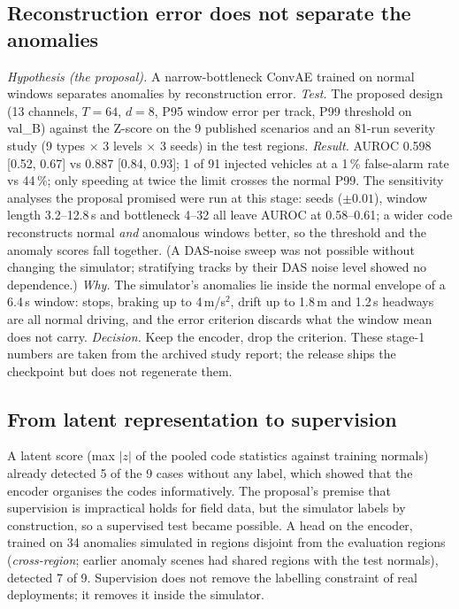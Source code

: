 \documentclass[10pt,a4paper,twocolumn]{article}
\begin{document}
\subsection{Reconstruction error does not separate the anomalies}
\emph{Hypothesis (the proposal).} A narrow-bottleneck ConvAE trained on normal windows separates anomalies by reconstruction error. \emph{Test.} The proposed design (13 channels, $T=64$, $d=8$, P95 window error per track, P99 threshold on val\_B) against the Z-score on the 9 published scenarios and an 81-run severity study (9 types $\times$ 3 levels $\times$ 3 seeds) in the test regions. \emph{Result.} AUROC 0.598 [0.52, 0.67] vs 0.887 [0.84, 0.93]; 1 of 91 injected vehicles at a 1\,\% false-alarm rate vs 44\,\%; only speeding at twice the limit crosses the normal P99. The sensitivity analyses the proposal promised were run at this stage: seeds ($\pm0.01$), window length 3.2--12.8\,s and bottleneck 4--32 all leave AUROC at 0.58--0.61; a wider code reconstructs normal \emph{and} anomalous windows better, so the threshold and the anomaly scores fall together. (A DAS-noise sweep was not possible without changing the simulator; stratifying tracks by their DAS noise level showed no dependence.) \emph{Why.} The simulator's anomalies lie inside the normal envelope of a 6.4\,s window: stops, braking up to 4\,m/s$^2$, drift up to 1.8\,m and 1.2\,s headways are all normal driving, and the error criterion discards what the window mean does not carry. \emph{Decision.} Keep the encoder, drop the criterion. These stage-1 numbers are taken from the archived study report; the release ships the checkpoint but does not regenerate them.

\subsection{From latent representation to supervision}
A latent score (max $|z|$ of the pooled code statistics against training normals) already detected 5 of the 9 \dev{} cases without any label, which showed that the encoder organises the codes informatively. The proposal's premise that supervision is impractical holds for field data, but the simulator labels by construction, so a supervised test became possible. A head on the encoder, trained on 34 anomalies simulated in regions disjoint from the evaluation regions (\emph{cross-region}; earlier anomaly scenes had shared regions with the test normals), detected 7 of 9. Supervision does not remove the labelling constraint of real deployments; it removes it inside the simulator.
\end{document}
